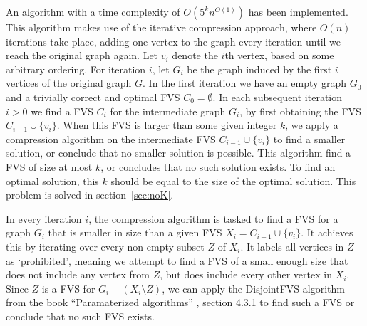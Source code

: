 
An algorithm with a time complexity of $O(5^kn^{O(1)})$ has been implemented. This algorithm makes use of the iterative
compression approach, where $O(n)$ iterations take place, adding one vertex to the graph every iteration until we reach
the original graph again. Let $v_i$ denote the $i$th vertex, based on some arbitrary ordering. For iteration $i$, let
$G_i$ be the graph induced by the first $i$ vertices of the original graph $G$. In the first iteration we have an empty
graph $G_0$ and a trivially correct and optimal FVS $C_0 = \emptyset$. In each subsequent iteration $i>0$ we find a FVS
$C_i$ for the intermediate graph $G_i$, by first obtaining the FVS $C_{i-1} \cup \{v_i\}$. When this FVS is larger than
some given integer $k$, we apply a compression algorithm on the intermediate FVS $C_{i-1} \cup \{v_i\}$ to find a
smaller solution, or conclude that no smaller solution is possible. This algorithm find a FVS of size at most $k$, or
concludes that no such solution exists. To find an optimal solution, this $k$ should be equal to the size of the optimal
solution. This problem is solved in section~\ref{sec:noK}.

In every iteration $i$, the compression algorithm is tasked to find a FVS for a graph $G_i$ that is smaller in size than
a given FVS $X_i = C_{i-1} \cup \{v_i\}$. It achieves this by iterating over every non-empty subset $Z$ of $X_i$. It
labels all vertices in $Z$ as `prohibited', meaning we attempt to find a FVS of a small enough size that does not
include any vertex from $Z$, but does include every other vertex in $X_i$. Since $Z$ is a FVS for $G_i-(X_i\setminus
Z)$, we can apply the {\sc DisjointFVS} algorithm from the book ``Paramaterized algorithms'' \cite{ftpbook}, section 4.3.1
to find such a FVS or conclude that no such FVS exists.

